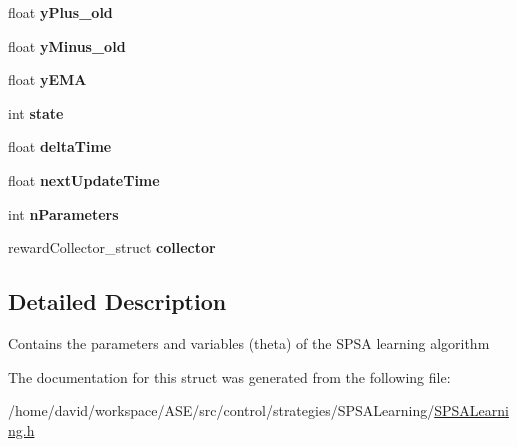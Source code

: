 \begin{CompactItemize}
\item 
\hypertarget{structSPSALearning__struct_3000131eb062bbd99daba914cce1bb9f}{
float \textbf{yPlus\_\-old}}
\label{structSPSALearning__struct_3000131eb062bbd99daba914cce1bb9f}

\item 
\hypertarget{structSPSALearning__struct_0f67f4c3484073986f0b47e6ab81d9ac}{
float \textbf{yMinus\_\-old}}
\label{structSPSALearning__struct_0f67f4c3484073986f0b47e6ab81d9ac}

\item 
\hypertarget{structSPSALearning__struct_a887a7ecb1d4c4fc24f1291469a0a1ed}{
float \textbf{yEMA}}
\label{structSPSALearning__struct_a887a7ecb1d4c4fc24f1291469a0a1ed}

\item 
\hypertarget{structSPSALearning__struct_24a4444b4ccc5909fcd430c7730126f9}{
int \textbf{state}}
\label{structSPSALearning__struct_24a4444b4ccc5909fcd430c7730126f9}

\item 
\hypertarget{structSPSALearning__struct_5dddef5aa19f723a43af07d480c4dafb}{
float \textbf{deltaTime}}
\label{structSPSALearning__struct_5dddef5aa19f723a43af07d480c4dafb}

\item 
\hypertarget{structSPSALearning__struct_d3920119a7e467a4834aa7a05495dd11}{
float \textbf{nextUpdateTime}}
\label{structSPSALearning__struct_d3920119a7e467a4834aa7a05495dd11}

\item 
\hypertarget{structSPSALearning__struct_cab0a7b00bdff9ae3ce5ce1909f6290f}{
int \textbf{nParameters}}
\label{structSPSALearning__struct_cab0a7b00bdff9ae3ce5ce1909f6290f}

\item 
\hypertarget{structSPSALearning__struct_01054d15b3d29ad166f5dd372f7bef0b}{
rewardCollector\_\-struct \textbf{collector}}
\label{structSPSALearning__struct_01054d15b3d29ad166f5dd372f7bef0b}

\end{CompactItemize}


\subsection{Detailed Description}
Contains the parameters and variables (theta) of the SPSA learning algorithm 

The documentation for this struct was generated from the following file:\begin{CompactItemize}
\item 
/home/david/workspace/ASE/src/control/strategies/SPSALearning/\hyperlink{SPSALearning_8h}{SPSALearning.h}\end{CompactItemize}
